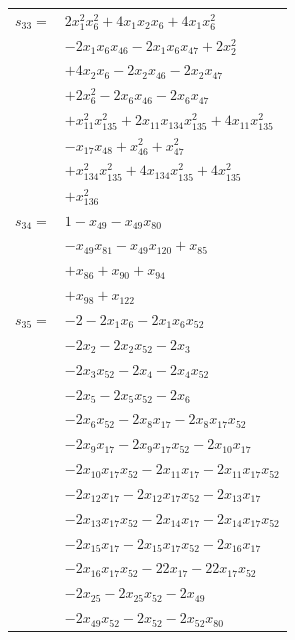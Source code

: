 \begin{longtable}{@{}r@{\;}l@{}}
\(s_{33}=\) & \(\displaystyle 2x_{1}^{2}x_{6}^{2} +4x_{1}x_{2}x_{6} +4x_{1}x_{6}^{2}\) \\
 & \(\displaystyle -2x_{1}x_{6}x_{46} -2x_{1}x_{6}x_{47} +2x_{2}^{2}\) \\
 & \(\displaystyle +4x_{2}x_{6} -2x_{2}x_{46} -2x_{2}x_{47}\) \\
 & \(\displaystyle +2x_{6}^{2} -2x_{6}x_{46} -2x_{6}x_{47}\) \\
 & \(\displaystyle +x_{11}^{2}x_{135}^{2} +2x_{11}x_{134}x_{135}^{2} +4x_{11}x_{135}^{2}\) \\
 & \(\displaystyle -x_{17}x_{48} +x_{46}^{2} +x_{47}^{2}\) \\
 & \(\displaystyle +x_{134}^{2}x_{135}^{2} +4x_{134}x_{135}^{2} +4x_{135}^{2}\) \\
 & \(\displaystyle +x_{136}^{2}\) \\[3pt]
\(s_{34}=\) & \(\displaystyle 1 -x_{49} -x_{49}x_{80}\) \\
 & \(\displaystyle -x_{49}x_{81} -x_{49}x_{120} +x_{85}\) \\
 & \(\displaystyle +x_{86} +x_{90} +x_{94}\) \\
 & \(\displaystyle +x_{98} +x_{122}\) \\[3pt]
\(s_{35}=\) & \(\displaystyle -2 -2x_{1}x_{6} -2x_{1}x_{6}x_{52}\) \\
 & \(\displaystyle -2x_{2} -2x_{2}x_{52} -2x_{3}\) \\
 & \(\displaystyle -2x_{3}x_{52} -2x_{4} -2x_{4}x_{52}\) \\
 & \(\displaystyle -2x_{5} -2x_{5}x_{52} -2x_{6}\) \\
 & \(\displaystyle -2x_{6}x_{52} -2x_{8}x_{17} -2x_{8}x_{17}x_{52}\) \\
 & \(\displaystyle -2x_{9}x_{17} -2x_{9}x_{17}x_{52} -2x_{10}x_{17}\) \\
 & \(\displaystyle -2x_{10}x_{17}x_{52} -2x_{11}x_{17} -2x_{11}x_{17}x_{52}\) \\
 & \(\displaystyle -2x_{12}x_{17} -2x_{12}x_{17}x_{52} -2x_{13}x_{17}\) \\
 & \(\displaystyle -2x_{13}x_{17}x_{52} -2x_{14}x_{17} -2x_{14}x_{17}x_{52}\) \\
 & \(\displaystyle -2x_{15}x_{17} -2x_{15}x_{17}x_{52} -2x_{16}x_{17}\) \\
 & \(\displaystyle -2x_{16}x_{17}x_{52} -22x_{17} -22x_{17}x_{52}\) \\
 & \(\displaystyle -2x_{25} -2x_{25}x_{52} -2x_{49}\) \\
 & \(\displaystyle -2x_{49}x_{52} -2x_{52} -2x_{52}x_{80}\) \\

\end{longtable}
